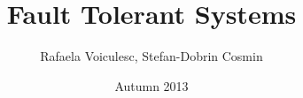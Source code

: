 \documentclass[11pt]{article} %
\title{Fault Tolerant Systems}
\author{Rafaela Voiculesc, Stefan-Dobrin Cosmin}
\date{Autumn 2013}
\begin{document}
\maketitle \newpage
\tableofcontents \newpage 







 

\nocite{*}

\end{document}
